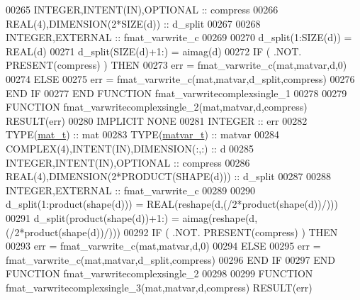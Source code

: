 \begin{DoxyCode}
00265     \textcolor{keywordtype}{INTEGER},\textcolor{keywordtype}{INTENT(IN)},\textcolor{keywordtype}{OPTIONAL}              :: compress
00266     \textcolor{keywordtype}{REAL(4)},\textcolor{keywordtype}{DIMENSION(2*SIZE(d))}             :: d\_split
00267 
00268     \textcolor{keywordtype}{INTEGER},\textcolor{keywordtype}{EXTERNAL}                         :: fmat\_varwrite\_c
00269 
00270     d\_split(1:\textcolor{keyword}{SIZE}(d))  = \textcolor{keywordtype}{REAL}(d)
00271     d\_split(\textcolor{keyword}{SIZE}(d)+1:) = aimag(d)
00272     \textcolor{keywordflow}{IF} ( .NOT. \textcolor{keyword}{PRESENT}(compress) ) \textcolor{keywordflow}{THEN}
00273         err = fmat\_varwrite\_c(mat,matvar,d,0)
00274     \textcolor{keywordflow}{ELSE}
00275         err = fmat\_varwrite\_c(mat,matvar,d\_split,compress)
00276 \textcolor{keywordflow}{    END IF}
00277 \textcolor{keyword}{END FUNCTION }fmat\_varwritecomplexsingle\_1
00278 
00279 \textcolor{keyword}{FUNCTION }fmat\_varwritecomplexsingle\_2(mat,matvar,d,compress) \textcolor{keyword}{RESULT}(err)
00280 \textcolor{keywordtype}{IMPLICIT NONE}
00281     \textcolor{keywordtype}{INTEGER}                                  :: err
00282     \textcolor{keywordtype}{TYPE}(\hyperlink{group___m_a_t_gab0fc888f5a5d79943b16284b1f91c2e8}{mat\_t})                              :: mat
00283     \textcolor{keywordtype}{TYPE}(\hyperlink{group___m_a_t_structmatvar__t}{matvar\_t})                           :: matvar
00284     \textcolor{keywordtype}{COMPLEX(4)},\textcolor{keywordtype}{INTENT(IN)},\textcolor{keywordtype}{DIMENSION(:,:)} :: d
00285     \textcolor{keywordtype}{INTEGER},\textcolor{keywordtype}{INTENT(IN)},\textcolor{keywordtype}{OPTIONAL}              :: compress
00286     \textcolor{keywordtype}{REAL(4)},\textcolor{keywordtype}{DIMENSION(2*PRODUCT(SHAPE(d)))} :: d\_split
00287 
00288     \textcolor{keywordtype}{INTEGER},\textcolor{keywordtype}{EXTERNAL}                         :: fmat\_varwrite\_c
00289 
00290     d\_split(1:product(shape(d)))  = \textcolor{keywordtype}{REAL}(reshape(d,(/2*product(shape(d))/)))
00291     d\_split(product(shape(d))+1:) = aimag(reshape(d,(/2*product(shape(d))/)))
00292     \textcolor{keywordflow}{IF} ( .NOT. \textcolor{keyword}{PRESENT}(compress) ) \textcolor{keywordflow}{THEN}
00293         err = fmat\_varwrite\_c(mat,matvar,d,0)
00294     \textcolor{keywordflow}{ELSE}
00295         err = fmat\_varwrite\_c(mat,matvar,d\_split,compress)
00296 \textcolor{keywordflow}{    END IF}
00297 \textcolor{keyword}{END FUNCTION }fmat\_varwritecomplexsingle\_2
00298 
00299 \textcolor{keyword}{FUNCTION }fmat\_varwritecomplexsingle\_3(mat,matvar,d,compress) \textcolor{keyword}{RESULT}(err)

\end{DoxyCode}
